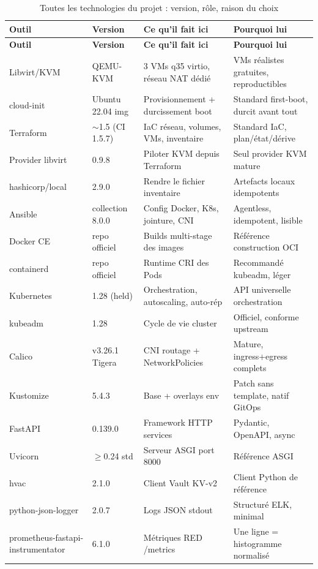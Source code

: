 \documentclass[12pt,a4paper,oneside]{report}
\begin{document}
{\footnotesize
\begin{longtable}{@{}p{3.0cm}p{1.9cm}p{4.7cm}p{4.7cm}@{}}
\caption{Toutes les technologies du projet : version, rôle, raison du choix}\\
\toprule
\textbf{Outil} & \textbf{Version} & \textbf{Ce qu'il fait ici} & \textbf{Pourquoi lui} \\
\midrule
\endfirsthead
\toprule
\textbf{Outil} & \textbf{Version} & \textbf{Ce qu'il fait ici} & \textbf{Pourquoi lui} \\
\midrule
\endhead
Libvirt/KVM & QEMU-KVM & 3 VMs q35 virtio, réseau NAT dédié & VMs réalistes gratuites, reproductibles \\
cloud-init & Ubuntu 22.04 img & Provisionnement + durcissement boot & Standard first-boot, durcit avant tout \\
Terraform & $\sim$1.5 (CI 1.5.7) & IaC réseau, volumes, VMs, inventaire & Standard IaC, plan/état/dérive \\
Provider libvirt & 0.9.8 & Piloter KVM depuis Terraform & Seul provider KVM mature \\
hashicorp/local & 2.9.0 & Rendre le fichier inventaire & Artefacts locaux idempotents \\
Ansible & collection 8.0.0 & Config Docker, K8s, jointure, CNI & Agentless, idempotent, lisible \\
Docker CE & repo officiel & Builds multi-stage des images & Référence construction OCI \\
containerd & repo officiel & Runtime CRI des Pods & Recommandé kubeadm, léger \\
Kubernetes & 1.28 (held) & Orchestration, autoscaling, auto-rép & API universelle orchestration \\
kubeadm & 1.28 & Cycle de vie cluster & Officiel, conforme upstream \\
Calico & v3.26.1 Tigera & CNI routage + NetworkPolicies & Mature, ingress+egress complets \\
Kustomize & 5.4.3 & Base + overlays env & Patch sans template, natif GitOps \\
FastAPI & 0.139.0 & Framework HTTP services & Pydantic, OpenAPI, async \\
Uvicorn & $\geq$0.24 std & Serveur ASGI port 8000 & Référence ASGI \\
hvac & 2.1.0 & Client Vault KV-v2 & Client Python de référence \\
python-json-logger & 2.0.7 & Logs JSON stdout & Structuré ELK, minimal \\
prometheus-fastapi-instrumentator & 6.1.0 & Métriques RED /metrics & Une ligne = histogramme normalisé \\

\end{longtable}}
\end{document}
